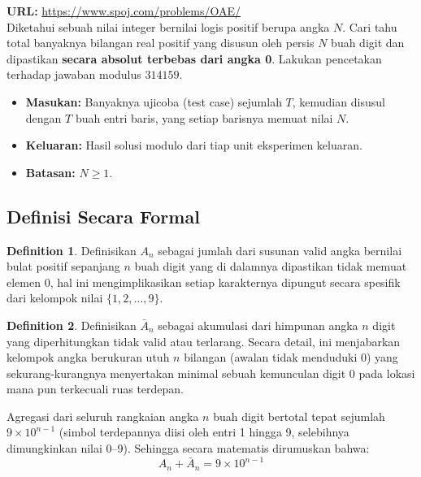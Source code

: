 \documentclass[12pt,a4paper]{article}
\theoremstyle{definition}
\newtheorem{definition}{Definition}[section]
\begin{document}
\begin{tcolorbox}[title=SPOJ 6172 -- OAE, colframe=black!60, colback=gray!5]
  \textbf{URL:} \url{https://www.spoj.com/problems/OAE/}\\[4pt]
  Diketahui sebuah nilai integer bernilai logis positif berupa angka $N$. Cari tahu 
  total banyaknya bilangan real positif yang disusun oleh persis $N$ buah digit
  dan dipastikan \textbf{secara absolut terbebas dari angka 0}.
  Lakukan pencetakan terhadap jawaban modulus $314159$.\\[4pt]
  \begin{itemize}
    \item \textbf{Masukan:} Banyaknya ujicoba (test case) sejumlah $T$, kemudian 
          disusul dengan $T$ buah entri baris, yang setiap barisnya memuat nilai $N$.
    \item \textbf{Keluaran:} Hasil solusi modulo dari tiap unit eksperimen keluaran.
    \item \textbf{Batasan:} $N \geq 1$.
  \end{itemize}
\end{tcolorbox}

\subsection{Definisi Secara Formal}

\begin{definition}
  Definisikan $A_n$ sebagai jumlah dari susunan valid angka bernilai bulat positif
  sepanjang $n$ buah digit yang di dalamnya dipastikan tidak memuat elemen 0,
  hal ini mengimplikasikan setiap karakternya dipungut secara spesifik dari 
  kelompok nilai $\{1, 2, \ldots, 9\}$.
\end{definition}

\begin{definition}
  Definisikan $\bar{A}_n$ sebagai akumulasi dari himpunan angka $n$ digit yang
  diperhitungkan tidak valid atau terlarang. Secara detail, ini menjabarkan
  kelompok angka berukuran utuh $n$ bilangan (awalan tidak menduduki 0)
  yang sekurang-kurangnya menyertakan minimal sebuah kemunculan digit 0 pada 
  lokasi mana pun terkecuali ruas terdepan.
\end{definition}

Agregasi dari seluruh rangkaian angka $n$ buah digit bertotal tepat sejumlah 
$9 \times 10^{n-1}$ (simbol terdepannya diisi oleh entri 1 hingga 9, selebihnya 
dimungkinkan nilai 0--9). Sehingga secara matematis dirumuskan bahwa:
\begin{equation}
  A_n + \bar{A}_n = 9 \times 10^{n-1}
\end{equation}
\end{document}

